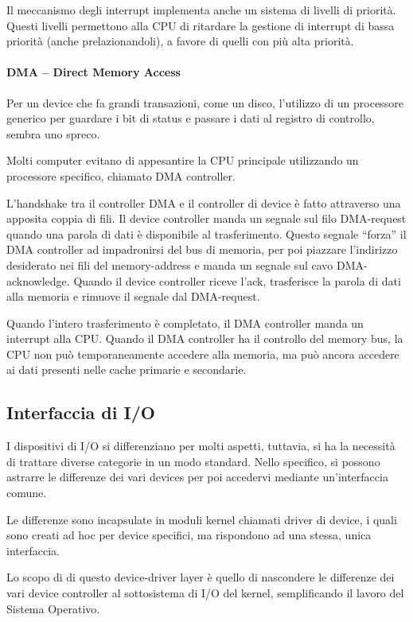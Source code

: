 \documentclass[a4]{article}
\begin{document}
Il meccanismo degli interrupt implementa anche un sistema di livelli di priorità. Questi livelli permettono alla CPU di ritardare la gestione di interrupt di bassa priorità (anche prelazionandoli), a favore di quelli con più alta priorità.

\paragraph{DMA -- Direct Memory Access}

Per un device che fa grandi transazioni, come un disco, l'utilizzo di un processore generico per guardare i bit di status e passare i dati al registro di controllo, sembra uno spreco.

Molti computer evitano di appesantire la CPU principale utilizzando un processore specifico, chiamato DMA controller.

L'handshake tra il controller DMA e il controller di device è fatto attraverso una apposita coppia di fili. Il device controller manda un segnale sul filo DMA-request quando una parola di dati è disponibile al trasferimento. Questo segnale ``forza'' il DMA controller ad impadronirsi del bus di memoria, per poi piazzare l'indirizzo desiderato nei fili del memory-address e manda un segnale sul cavo DMA-acknowledge. Quando il device controller riceve l'ack, trasferisce la parola di dati alla memoria e rimuove il segnale dal DMA-request.

Quando l'intero trasferimento è completato, il DMA controller manda un interrupt alla CPU. Quando il DMA controller ha il controllo del memory bus, la CPU non può temporaneamente accedere alla memoria, ma può ancora accedere ai dati presenti nelle cache primarie e secondarie.

\subsection{Interfaccia di I/O}

I dispositivi di I/O si differenziano per molti aspetti, tuttavia, si ha la necessità di trattare diverse categorie in un modo standard. Nello specifico, si possono astrarre le differenze dei vari devices per poi accedervi mediante un'interfaccia comune.

Le differenze sono incapsulate in moduli kernel chiamati driver di device, i quali sono creati ad hoc per device specifici, ma rispondono ad una stessa, unica interfaccia.

Lo scopo di di questo device-driver layer è quello di nascondere le differenze dei vari device controller al sottosistema di I/O del kernel, semplificando il lavoro del Sistema Operativo.
\end{document}

